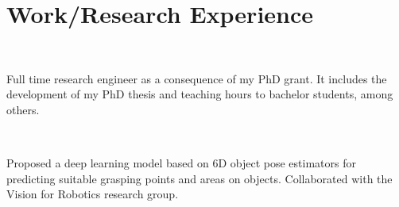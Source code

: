 \documentclass[]{deedy-resume-openfont}
\begin{document}
\hfill
\begin{minipage}[t]{0.495\textwidth} 


\section{Work/Research Experience}

 \\
\vspace{\topsep} %
\begin{tightemize}
	\item Full time research engineer as a consequence of my PhD grant. It includes the development of my PhD thesis and teaching hours to bachelor students, among others.
\end{tightemize}

\sectionsep

 \\
\begin{tightemize}
	\item Proposed a deep learning model based on 6D object pose estimators for predicting suitable grasping points and areas on objects. Collaborated with the Vision for Robotics research group.
\end{tightemize}

\sectionsep

%


\end{minipage}
\end{document}
